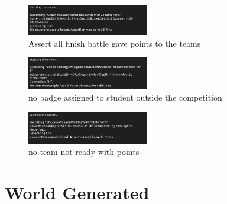 \begin{figure}[H]
    \centering
    \includegraphics[width=200px]{Images/alloy/assert_4.png}
    \caption{Assert all finish battle gave points to the teams}
\end{figure}

\begin{figure}[H]
    \centering
    \includegraphics[width=200px]{Images/alloy/assert_5.png}
    \caption{no badge assigned to student outside the competition}
\end{figure}

\begin{figure}[H]
    \centering
    \includegraphics[width=200px]{Images/alloy/assert_6.png}
    \caption{no team not ready with points}
\end{figure}

\section{World Generated}

